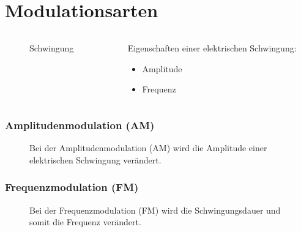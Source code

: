 
\section{Modulationsarten}
\label{section:modulationsarten}
\begin{frame}%

\begin{columns}
    \begin{column}{0.48\textwidth}
    
\begin{figure}
    \caption{\scriptsize Schwingung}
    \label{n_schwingung}
\end{figure}


    \end{column}
   \begin{column}{0.48\textwidth}
       Eigenschaften einer elektrischen Schwingung:

\begin{itemize}
  \item Amplitude
  \item Frequenz
  \end{itemize}

   \end{column}
\end{columns}

\end{frame}

\begin{frame}
\frametitle{Amplitudenmodulation (AM)}

\begin{figure}
    \caption{\scriptsize Bei der Amplitudenmodulation (AM) wird die Amplitude einer elektrischen Schwingung verändert.}
    \label{n_modulationsarten_am}
\end{figure}

\end{frame}

\begin{frame}
\frametitle{Frequenzmodulation (FM)}

\begin{figure}
    \caption{\scriptsize Bei der Frequenzmodulation (FM) wird die Schwingungsdauer und somit die Frequenz verändert.}
    \label{n_modulationsarten_am}
\end{figure}

\end{frame}%

